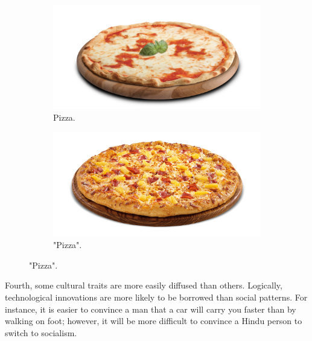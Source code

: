 \documentclass[../main.tex]{subfiles}
\begin{document}
\begin{figure}[h]
\centering
\begin{subfigure}{.5\textwidth}
  \centering
  \includegraphics[width=.53\linewidth]{images/margherita.png}
  \caption{Pizza.}
  \label{fig:sub1}
\end{subfigure}%
\begin{subfigure}{.5\textwidth}
  \centering
  \includegraphics[width=.5\linewidth]{images/hawaii.png}
  \caption{"Pizza".}
  \label{fig:sub2}
\end{subfigure}
\end{figure}

Fourth, some cultural traits are more easily diffused than others. Logically, technological innovations are more likely to be borrowed than social patterns. For instance, it is easier to convince a man that a car will carry you faster than by walking on foot; however, it will be more difficult to convince a Hindu person to switch to socialism.\\
\end{document}

